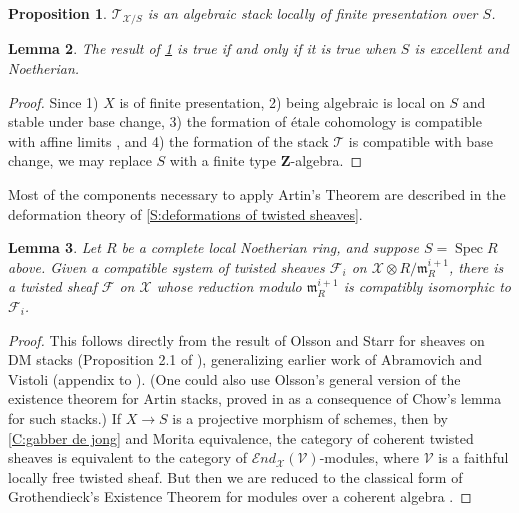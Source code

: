 \documentclass[11pt]{amsart}
\newcommand{\field}[1]{\mathbf #1}
\newcommand{\mf}[1]{\mathfrak #1}
\newcommand{\ms}[1]{\mathscr #1}
\newcommand{\Z}{\field Z}
\newcommand{\send}{\ms E\!nd}
\newcommand{\spec}{\operatorname{Spec}}
\renewcommand{\[}{[\!\hspace{0.03em}[}
\renewcommand{\]}{]\!\hspace{0.03em}]}
\renewcommand{\(}{(\!\hspace{0.03em}(}
\renewcommand{\)}{)\!\hspace{0.03em})}
\DeclareMathOperator*{\tensor}{\otimes}
\newtheorem{lem}{Lemma}[subsubsection]%
\newtheorem{prop}[lem]{Proposition}
\theoremstyle{definition}
\theoremstyle{remark}
\begin{document}
\begin{prop}\label{P:abstract existence} $\ms T_{\ms X/S}$ is an algebraic stack locally of finite 
presentation over $S$.
\end{prop}

\begin{lem}\label{C:general abstract existence} The result of 
\ref{P:abstract existence} is true if and only if it is true when $S$ 
is excellent and Noetherian.
\end{lem}
\begin{proof} Since 1) $X$ is of finite presentation, 2) being algebraic is 
local on $S$ and stable under base change, 3) the formation of \'etale cohomology is compatible 
with affine limits \cite[I.4]{freitag-kiehl}, and 4) the formation of the stack $\ms T$ 
is compatible with base change, we may replace $S$ with a finite type 
$\Z$-algebra.
\end{proof}

Most of the components necessary to apply Artin's Theorem are described 
in the deformation theory of \ref{S:deformations of twisted 
sheaves}.

\begin{lem}\label{L:existence theorem} Let $R$ be a complete local Noetherian 
ring, and suppose $S=\spec R$ above.  Given a compatible system of 
twisted sheaves $\ms F_{i}$ on $\ms X\tensor R/\mf m_{R}^{i+1}$, there 
is a twisted sheaf $\ms F$ on $\ms X$ whose reduction modulo $\mf 
m_{R}^{i+1}$ is compatibly isomorphic to $\ms F_{i}$.
\end{lem}
\begin{proof} This follows directly from the result of 
Olsson and Starr for sheaves on DM stacks (Proposition 2.1 of \cite{olsson-starr}), 
generalizing earlier work of Abramovich and Vistoli (appendix to 
\cite{abramovich-vistoli}).  (One could also use Olsson's general version of the existence theorem for Artin stacks, proved in \cite{olsson-chow} as a consequence of Chow's lemma for such stacks.)  If $X\to S$ is a projective 
morphism of schemes, then by \ref{C:gabber 
de jong} and Morita equivalence, the category of coherent twisted sheaves is 
equivalent to the category of $\send_{\ms X}(\ms V)$-modules, where 
$\ms V$ is a faithful locally free twisted sheaf.  But 
then we are reduced to the classical form of 
Grothendieck's Existence Theorem for modules over a coherent algebra 
\cite[\S5]{ega3-1}.
\end{proof}
\end{document}
